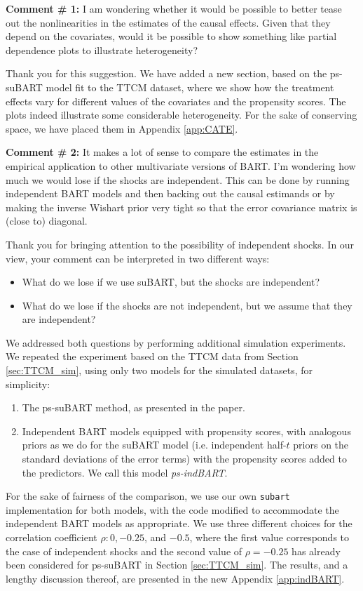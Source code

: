 \documentclass{article}
\begin{document}
\begin{mdframed}
    \textbf{Comment \# 1:} I am wondering whether it would be possible to better tease out the nonlinearities in the estimates of the causal effects. Given that they depend on the covariates, would it be possible to show something like partial dependence plots to illustrate heterogeneity?
\end{mdframed}

Thank you for this suggestion. We have added a new section, based on the ps-suBART model fit to the TTCM dataset, where we show how the treatment effects vary for different values of the covariates and the propensity scores. The plots indeed illustrate some considerable heterogeneity. For the sake of conserving space, we have placed them in Appendix \ref{app:CATE}. 

\begin{mdframed}
    \textbf{Comment \# 2:} It makes a lot of sense to compare the estimates in the empirical application to other multivariate versions of BART. I'm wondering how much we would lose if the shocks are independent. This can be done by running independent BART models and then backing out the causal estimands or by making the inverse Wishart prior very tight so that the error covariance matrix is (close to) diagonal.
\end{mdframed}

Thank you for bringing attention to the possibility of independent shocks. In our view, your comment can be interpreted in two different ways:
\begin{itemize}
    \item What do we lose if we use suBART, but the shocks are independent?
    \item What do we lose if the shocks are not independent, but we assume that they are independent?
\end{itemize}
 We addressed both questions by performing additional simulation experiments. We repeated the experiment based on the TTCM data from Section \ref{sec:TTCM_sim}, using only two models for the simulated datasets, for simplicity:
 \begin{enumerate}
    \item The ps-suBART method, as presented in the paper.
    \item Independent BART models equipped with propensity scores, with analogous priors as we do for the suBART model (i.e. independent half-$t$ priors on the standard deviations of the error terms)
    with the propensity scores added to the predictors. We call this model \emph{ps-indBART}.
\end{enumerate}
For the sake of fairness of the comparison, we use our own \texttt{subart} implementation for both models, with the code modified to accommodate the independent BART models as appropriate. We use three different choices for the correlation coefficient $\rho\colon 0, -0.25$, and $-0.5$, where the first value corresponds to the case of independent shocks and the second value of $\rho=-0.25$ has already been considered for ps-suBART in Section \ref{sec:TTCM_sim}. The results, and a lengthy discussion thereof, are presented in the new Appendix \ref{app:indBART}. 
\end{document}
